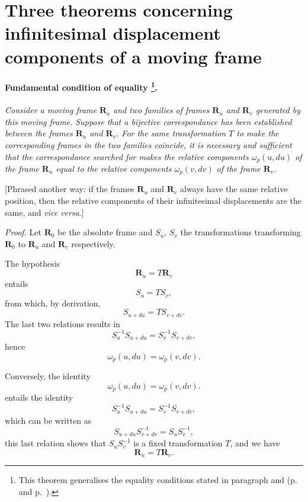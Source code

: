 \section[{Three theorems concerning infinitesimal displacement components of a moving frame}]{Three theorems concerning infinitesimal displacement components of a moving frame}
\label{sec:three-theor-conc}

\paragraph[{Fundamental condition of equality.}]{Fundamental condition of equality \footnote{This theorem generalises the equality conditions stated in paragraph  and  (p.~\pageref{sec:7} and p.~\pageref{sec:26}).}.}
\label{sec:76}
\emph{Consider a moving frame $\mathbf{R}_{a}$ and two families of frames $\mathbf{R}_{u}$ and $\mathbf{R}_{v}$ generated by this moving frame. Suppose that a bijective correspondance has been established between the frames $\mathbf{R}_{u}$ and $\mathbf{R}_{v}$. For the same transformation $T$ to make the corresponding frames in the two families coincide, it is necessary and sufficient that the correspondance searched for makes the relative components $\omega_{p}(u,du)$ of the frame $\mathbf{R}_{u}$ equal to the relative components $\omega_{p}(v,dv)$ of the frame $\mathbf{R}_{v}$.}

\somespace

[Phrased another way: if the frames $\mathbf{R}_{u}$ and $\mathbf{R}_{v}$ always have the same relative position, then the relative components of their infinitesimal displacements are the same, and \emph{vice versa}.]

\somespace

\emph{Proof.} Let $\mathbf{R}_{0}$ be the absolute frame and $S_{u}$, $S_{v}$ the transformations transforming $\mathbf{R}_{0}$ to $\mathbf{R}_{u}$ and $\mathbf{R}_{v}$ respectively.

The hypothesis
\[
\mathbf{R}_{u}=T\mathbf{R}_{v}
\]
entails
\[
S_{u}=TS_{v},
\]
from which, by derivation,
\[
S_{u+du}=TS_{v+dv}.
\]
The last two relations results in
\[
S_{u}^{-1}S_{u+du}=S_{v}^{-1}S_{v+dv},
\]
hence
\[
\omega_{p}(u,du)=\omega_{p}(v,dv).
\]

Conversely, the identity
\[
\omega_{p}(u,du)=\omega_{p}(v,dv).
\]
entails the identity
\[
S_{u}^{-1}S_{u+du}=S_{v}^{-1}S_{v+dv},
\]
which can be written as
\[
S_{u+du}S_{v+dv}^{-1}=S_{u}S_{v}^{-1},
\]
this last relation shows that $S_{u}S_{v}^{-1}$ is a fixed transformation $T$, and we have
\[
\mathbf{R}_{u}=T\mathbf{R}_{v}.
\]

